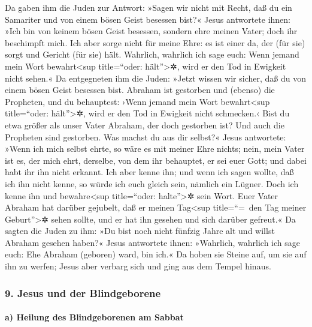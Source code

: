  Da gaben ihm die Juden zur Antwort: »Sagen wir nicht mit
Recht, daß du ein Samariter und von einem bösen Geist besessen bist?«
 Jesus antwortete ihnen: »Ich bin von keinem bösen Geist
besessen, sondern ehre meinen Vater; doch ihr beschimpft mich.
 Ich aber sorge nicht für meine Ehre: es ist einer da,
der (für sie) sorgt und Gericht (für sie) hält. 
Wahrlich, wahrlich ich sage euch: Wenn jemand mein Wort
bewahrt\textless sup title=``oder: hält''\textgreater✲, wird er den Tod
in Ewigkeit nicht sehen.«  Da entgegneten ihm die Juden:
»Jetzt wissen wir sicher, daß du von einem bösen Geist besessen bist.
Abraham ist gestorben und (ebenso) die Propheten, und du behauptest:
›Wenn jemand mein Wort bewahrt\textless sup title=``oder:
hält''\textgreater✲, wird er den Tod in Ewigkeit nicht schmecken.‹
 Bist du etwa größer als unser Vater Abraham, der doch
gestorben ist? Und auch die Propheten sind gestorben. Was machst du aus
dir selbst?«  Jesus antwortete: »Wenn ich mich selbst
ehrte, so wäre es mit meiner Ehre nichts; nein, mein Vater ist es, der
mich ehrt, derselbe, von dem ihr behauptet, er sei euer Gott;
 und dabei habt ihr ihn nicht erkannt. Ich aber kenne
ihn; und wenn ich sagen wollte, daß ich ihn nicht kenne, so würde ich
euch gleich sein, nämlich ein Lügner. Doch ich kenne ihn und
bewahre\textless sup title=``oder: halte''\textgreater✲ sein Wort.
 Euer Vater Abraham hat darüber gejubelt, daß er meinen
Tag\textless sup title=``=~den Tag meiner Geburt''\textgreater✲ sehen
sollte, und er hat ihn gesehen und sich darüber gefreut.«
 Da sagten die Juden zu ihm: »Du bist noch nicht fünfzig
Jahre alt und willst Abraham gesehen haben?«  Jesus
antwortete ihnen: »Wahrlich, wahrlich ich sage euch: Ehe Abraham
(geboren) ward, bin ich.«  Da hoben sie Steine auf, um
sie auf ihn zu werfen; Jesus aber verbarg sich und ging aus dem Tempel
hinaus.

\hypertarget{jesus-und-der-blindgeborene}{%
\subsubsection{9. Jesus und der
Blindgeborene}\label{jesus-und-der-blindgeborene}}

\hypertarget{a-heilung-des-blindgeborenen-am-sabbat}{%
\paragraph{a) Heilung des Blindgeborenen am
Sabbat}\label{a-heilung-des-blindgeborenen-am-sabbat}}

